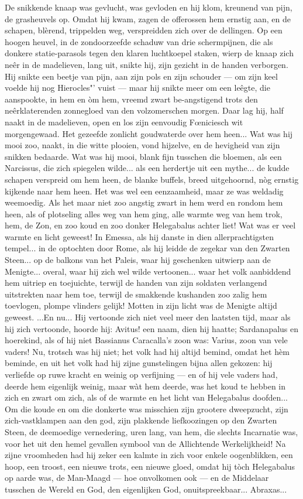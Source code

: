 \documentclass[a4paper, 12pt, oneside, dutch]{article}
\begin{document}
De snikkende knaap was gevlucht, was gevloden en hij klom, kreunend van pijn, de grasheuvels op. Omdat hij kwam, zagen de offerossen hem ernstig aan, en de schapen, blèrend, trippelden weg, verspreidden zich over de dellingen. Op een hoogen heuvel, in de zondoorzeefde schaduw van drie schermpijnen, die als donkere statie-parasols tegen den klaren luchtkoepel staken, wierp de knaap zich neêr in de madelieven, lang uit, snikte hij, zijn gezicht in de handen verborgen. Hij snikte een beetje van pijn, aan zijn pols en zijn schouder --- om zijn keel voelde hij nog Hierocles"' vuist --- maar hij snikte meer om een leêgte, die aanspookte, in hem en òm hem, vreemd zwart be-angstigend trots den neêrklaterenden zonnegloed van den volzomerschen morgen. Daar lag hij, half naakt in de madelieven, open en los zijn eenvoudig Fœniciesch wit morgengewaad. Het gezeefde zonlicht goudwaterde over hem heen... Wat was hij mooi zoo, naakt, in die witte plooien, vond hijzelve, en de hevigheid van zijn snikken bedaarde. Wat was hij mooi, blank fijn tusschen die bloemen, als een Narcissus, die zich spiegelen wilde... als een herdertje uit een mythe... de kudde schapen verspreid om hem heen, de blanke buffels, breed uitgehoornd, nòg ernstig kijkende naar hem heen. Het was wel een eenzaamheid, maar ze was weldadig weemoedig. Als het maar niet zoo angstig zwart in hem werd en rondom hem heen, als of plotseling alles weg van hem ging, alle warmte weg van hem trok, hem, de Zon, en zoo koud en zoo donker Helegabalus achter liet! Wat was er veel warmte en licht geweest! In Emessa, als hij danste in dien allerprachtigsten tempel... in de optochten door Rome, als hij leidde de zegekar van den Zwarten Steen... op de balkons van het Paleis, waar hij geschenken uitwierp aan de Menigte... overal, waar hij zich wel wilde vertoonen... waar het volk aanbiddend hem uitriep en toejuichte, terwijl de handen van zijn soldaten verlangend uitstrekten naar hem toe, terwijl de smakkende kushanden zoo zalig hem toevlogen, plompe vlinders gelijk! Motten in zijn licht was de Menigte altijd geweest. ...En nu... Hij vertoonde zich niet veel meer den laatsten tijd, maar als hij zich vertoonde, hoorde hij: Avitus! een naam, dien hij haatte; Sardanapalus en hoerekind, als of hij niet Bassianus Caracalla's zoon was: Varius, zoon van vele vaders! Nu, trotsch was hij niet; het volk had hij altijd bemind, omdat het hèm beminde, en uit het volk had hij zijne gunstelingen bijna allen gekozen: hij verliefde op ruwe kracht en weinig op verfijning --- en of hij vele vaders had, deerde hem eigenlijk weinig, maar wàt hem deerde, was het koud te hebben in zich en zwart om zich, als of de warmte en het licht van Helegabalus doofden... Om die koude en om die donkerte was misschien zijn grootere dweepzucht, zijn zich-vastklampen aan den god, zijn plakkende liefkoozingen op den Zwarten Steen, de deemoedige vernedering, uren lang, van hem, die slechts Incarnatie was, voor het uit den hemel gevallen symbool van de Allichtende Werkelijkheid! Na zijne vroomheden had hij zeker een kalmte in zich voor enkele oogenblikken, een hoop, een troost, een nieuwe trots, een nieuwe gloed, omdat hij tòch Helegabalus op aarde was, de Man-Maagd --- hoe onvolkomen ook --- en de Middelaar tusschen de Wereld en God, den eigenlijken God, onuitspreekbaar... Abraxas... 
\end{document}
